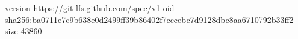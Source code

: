 version https://git-lfs.github.com/spec/v1
oid sha256:ba0711e7c9b638e0d2499ff39b86402f7cccebc7d9128dbc8aa6710792b33ff2
size 43860
